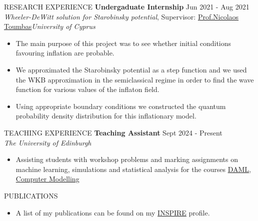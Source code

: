\documentclass{resume} %
\begin{document}
\begin{rSection}{RESEARCH EXPERIENCE}
                \textbf{Undergaduate Internship} \hfill Jun 2021 - Aug 2021\\
                {\it Wheeler-DeWitt solution for Starobinsky potential}, Supervisor:  \href{https://www.ucy.ac.cy/directory/en/profile/nick}{Prof.\@ Nicolaos Toumbas}\hfill \textit{University of Cyprus}
                \begin{itemize}
                        \itemsep -3pt {} 
                        \item The main purpose of this project was to see whether initial conditions favouring inflation are probable.
                        \item We approximated the Starobinsky potential as a step function and we used the WKB approximation in the semiclassical regime in order to find the wave function for various values of the inflaton field.
                        \item Using appropriate boundary conditions we constructed the quantum probability density distribution for this inflationary model.
                \end{itemize}
        \end{rSection} 

        \bigbreak

        \begin{rSection}{TEACHING EXPERIENCE}
                \textbf{Teaching Assistant} \hfill Sept 2024 - Present\\
                {\it The University of Edinburgh}
                \begin{itemize}
                        \itemsep -3pt {} 
                        \item Assisting students with workshop problems and marking assignments on machine learning, simulations and statistical analysis for the courses \href{http://www.drps.ed.ac.uk/24-25/dpt/cxpgph11105.htm}{DAML}, \href{http://www.drps.ed.ac.uk/24-25/dpt/cxphys09057.htm}{Computer Modelling}
                \end{itemize}
        \end{rSection}

        \bigbreak

        \begin{rSection}{PUBLICATIONS}
                \begin{itemize}
                        \item A list of my publications can be found on my \href{https://inspirehep.net/authors/2313765}{INSPIRE} profile.
                \end{itemize}
        \end{rSection}
\end{document}
